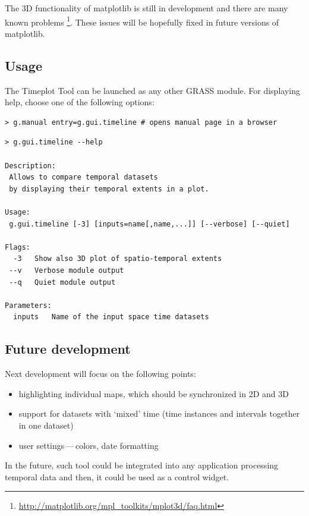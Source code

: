 \documentclass[a4paper,12pt]{book}
\begin{document}
The 3D functionality of matplotlib is still in development and there are many known problems%
\footnote{\url{http://matplotlib.org/mpl_toolkits/mplot3d/faq.html}}.
These issues will be hopefully fixed in future versions of matplotlib.


\subsection{Usage}
The Timeplot Tool can be launched as any other GRASS module.
For displaying help, choose one of the following options:
\begin{small}
\begin{lstlisting}[style=mybash]
> g.manual entry=g.gui.timeline # opens manual page in a browser
\end{lstlisting}
\end{small}

\begin{small}
\begin{lstlisting}[style=mybash]
> g.gui.timeline --help

Description:
 Allows to compare temporal datasets
 by displaying their temporal extents in a plot.

Usage:
 g.gui.timeline [-3] [inputs=name[,name,...]] [--verbose] [--quiet]

Flags:
  -3   Show also 3D plot of spatio-temporal extents
 --v   Verbose module output
 --q   Quiet module output

Parameters:
  inputs   Name of the input space time datasets

\end{lstlisting}
\end{small}

\subsection{Future development}
Next development will focus on the following points:
\begin{itemize}
  \item highlighting individual maps, which should be synchronized in 2D and 3D
  \item support for datasets with `mixed' time (time instances and intervals together in one dataset)
  \item user settings\,---\,colors, date formatting
\end{itemize}
In the future, such tool could be integrated into any application processing temporal data
and then, it could be used as a control widget.
\end{document}

